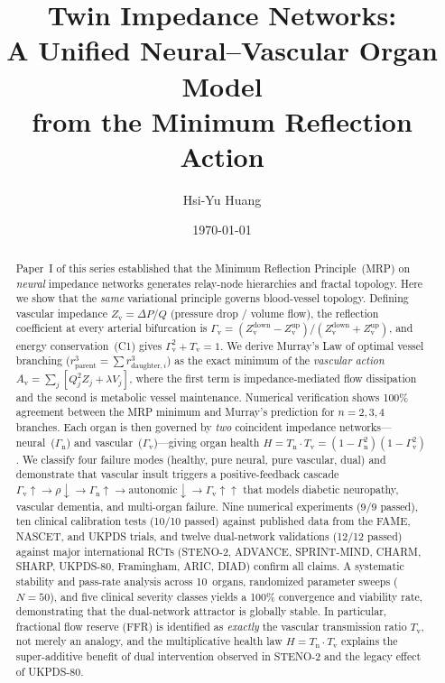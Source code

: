 ﻿\documentclass[aps,pre,twocolumn,superscriptaddress,floatfix]{revtex4-2}
\newcommand{\Gv}{\Gamma_{\mathrm{v}}}
\newcommand{\Gn}{\Gamma_{\mathrm{n}}}
\newcommand{\Tv}{T_{\mathrm{v}}}
\newcommand{\Tn}{T_{\mathrm{n}}}
\newcommand{\Av}{A_{\mathrm{v}}}
\newcommand{\Zv}{Z_{\mathrm{v}}}
\begin{document}
\title{Twin Impedance Networks:\\
A Unified Neural--Vascular Organ Model\\
from the Minimum Reflection Action}

\author{Hsi-Yu Huang}

\date{\today}

\begin{abstract}
Paper~I of this series established that the Minimum Reflection
Principle~(MRP) on \emph{neural} impedance networks generates
relay-node hierarchies and fractal topology.
Here we show that the \emph{same} variational principle governs
blood-vessel topology.
Defining vascular impedance $\Zv = \Delta P / Q$
(pressure drop / volume flow), the reflection coefficient at
every arterial bifurcation is
$\Gv = (\Zv^{\text{down}} - \Zv^{\text{up}}) /
       (\Zv^{\text{down}} + \Zv^{\text{up}})$,
and energy conservation~(C1) gives $\Gv^2 + \Tv = 1$.
We derive Murray's Law of optimal vessel branching
($r_{\text{parent}}^3 = \sum r_{\text{daughter},i}^3$)
as the exact minimum of the \emph{vascular action}
$\Av = \sum_j [Q_j^2 Z_j + \lambda V_j]$,
where the first term is impedance-mediated flow dissipation
and the second is metabolic vessel maintenance.
Numerical verification shows 100\% agreement between the
MRP minimum and Murray's prediction for $n=2,3,4$ branches.
Each organ is then governed by \emph{two} coincident
impedance networks---neural~($\Gn$) and
vascular~($\Gv$)---giving organ health
$H = \Tn \cdot \Tv = (1-\Gn^2)(1-\Gv^2)$.
We classify four failure modes (healthy, pure neural,
pure vascular, dual) and demonstrate that
vascular insult triggers a positive-feedback cascade
$\Gv\!\uparrow \to \rho\!\downarrow \to \Gn\!\uparrow
\to \text{autonomic}\!\downarrow \to \Gv\!\uparrow\!\uparrow$
that models diabetic neuropathy, vascular dementia, and
multi-organ failure.
Nine numerical experiments (9/9 passed), ten clinical
calibration tests (10/10 passed) against published data
from the FAME, NASCET, and UKPDS trials, and twelve
dual-network validations (12/12 passed) against major
international RCTs (STENO-2, ADVANCE, SPRINT-MIND,
CHARM, SHARP, UKPDS-80, Framingham, ARIC, DIAD)
confirm all claims.
A systematic stability and pass-rate analysis across 10~organs,
randomized parameter sweeps ($N=50$), and five clinical severity
classes yields a 100\% convergence and viability rate,
demonstrating that the dual-network attractor is globally stable.  In particular, fractional flow
reserve (FFR) is identified as \emph{exactly} the
vascular transmission ratio $\Tv$, not merely an analogy,
and the multiplicative health law $H = \Tn \cdot \Tv$
explains the super-additive benefit of dual intervention
observed in STENO-2 and the legacy effect of UKPDS-80.
\end{abstract}
\end{document}
